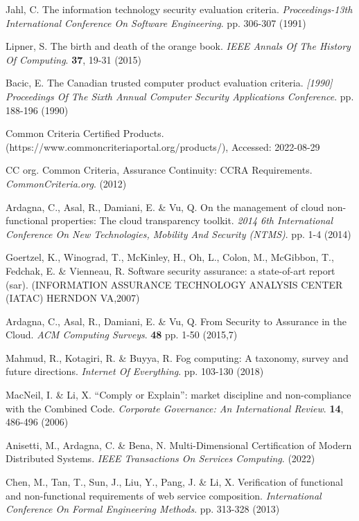 Jahl, C. The information technology security evaluation criteria. {\em Proceedings-13th International Conference On Software Engineering}. pp. 306-307 (1991)

Lipner, S. The birth and death of the orange book. {\em IEEE Annals Of The History Of Computing}. \textbf{37}, 19-31 (2015)

Bacic, E. The Canadian trusted computer product evaluation criteria. {\em [1990] Proceedings Of The Sixth Annual Computer Security Applications Conference}. pp. 188-196 (1990)

Common Criteria Certified Products. (https://www.commoncriteriaportal.org/products/), Accessed: 2022-08-29

 CC org. Common Criteria, Assurance Continuity: CCRA Requirements. {\em CommonCriteria.org}. (2012)

Ardagna, C., Asal, R., Damiani, E. \& Vu, Q. On the management of cloud non-functional properties: The cloud transparency toolkit. {\em 2014 6th International Conference On New Technologies, Mobility And Security (NTMS)}. pp. 1-4 (2014)

Goertzel, K., Winograd, T., McKinley, H., Oh, L., Colon, M., McGibbon, T., Fedchak, E. \& Vienneau, R. Software security assurance: a state-of-art report (sar). (INFORMATION ASSURANCE TECHNOLOGY ANALYSIS CENTER (IATAC) HERNDON VA,2007)

Ardagna, C., Asal, R., Damiani, E. \& Vu, Q. From Security to Assurance in the Cloud. {\em ACM Computing Surveys}. \textbf{48} pp. 1-50 (2015,7)

Mahmud, R., Kotagiri, R. \& Buyya, R. Fog computing: A taxonomy, survey and future directions. {\em Internet Of Everything}. pp. 103-130 (2018)

MacNeil, I. \& Li, X. “Comply or Explain”: market discipline and non-compliance with the Combined Code. {\em Corporate Governance: An International Review}. \textbf{14}, 486-496 (2006)

Anisetti, M., Ardagna, C. \& Bena, N. Multi-Dimensional Certification of Modern Distributed Systems. {\em IEEE Transactions On Services Computing}. (2022)

Chen, M., Tan, T., Sun, J., Liu, Y., Pang, J. \& Li, X. Verification of functional and non-functional requirements of web service composition. {\em International Conference On Formal Engineering Methods}. pp. 313-328 (2013)

